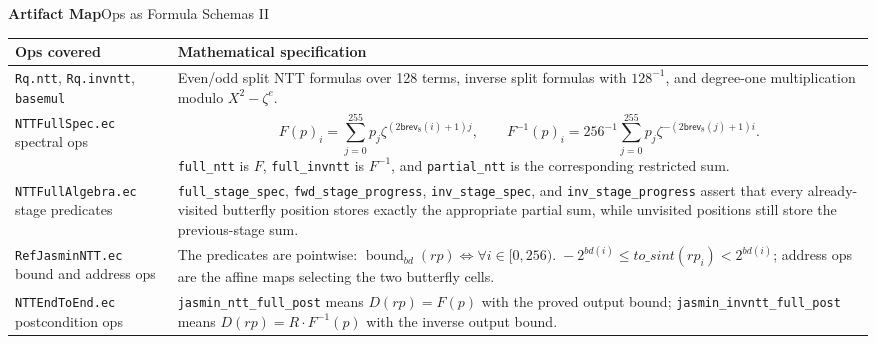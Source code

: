 \documentclass[10pt,aspectratio=1610,compress,dvipsnames]{beamer}
\newcommand{\brev}{\ensuremath{\mathsf{brev}}}
\newcommand{\ec}[1]{\texttt{#1}}
\begin{document}
\begin{frame}{\bfseries Artifact Map}{Ops as Formula Schemas II}
\begin{center}
\tiny\renewcommand{\arraystretch}{1.13}
\setlength{\tabcolsep}{3pt}
\begin{tabular}{p{2.8cm}p{8.2cm}}
\toprule[1.2pt]
\textbf{Ops covered} & \textbf{Mathematical specification} \\
\midrule
\ec{Rq.ntt}, \ec{Rq.invntt}, \ec{basemul} &
Even/odd split NTT formulas over 128 terms, inverse split formulas with
$128^{-1}$, and degree-one multiplication modulo $X^2-\zeta^e$. \\
\ec{NTTFullSpec.ec} spectral ops &
\[
F(p)_i=\sum_{j=0}^{255}p_j\zeta^{(2\brev_8(i)+1)j},\qquad
F^{-1}(p)_i=256^{-1}\sum_{j=0}^{255}p_j\zeta^{-(2\brev_8(j)+1)i}.
\]
\ec{full\_ntt} is $F$, \ec{full\_invntt} is $F^{-1}$, and
\ec{partial\_ntt} is the corresponding restricted sum. \\
\ec{NTTFullAlgebra.ec} stage predicates &
\ec{full\_stage\_spec}, \ec{fwd\_stage\_progress},
\ec{inv\_stage\_spec}, and \ec{inv\_stage\_progress} assert that every
already-visited butterfly position stores exactly the appropriate partial
sum, while unvisited positions still store the previous-stage sum. \\
\ec{RefJasminNTT.ec} bound and address ops &
The predicates are pointwise:
$\operatorname{bound}_{bd}(rp)\iff
\forall i\in[0,256).\; -2^{bd(i)}\le to\_sint(rp_i)<2^{bd(i)}$;
address ops are the affine maps selecting the two butterfly cells. \\
\ec{NTTEndToEnd.ec} postcondition ops &
\ec{jasmin\_ntt\_full\_post} means $D(rp)=F(p)$ with the proved output bound;
\ec{jasmin\_invntt\_full\_post} means
$D(rp)=R\cdot F^{-1}(p)$ with the inverse output bound. \\
\bottomrule[1.2pt]
\end{tabular}
\end{center}
\end{frame}
\end{document}
